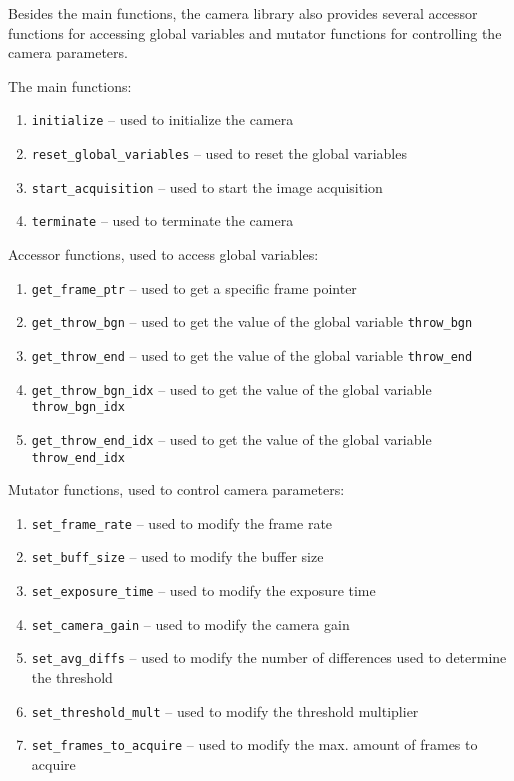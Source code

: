Besides the main functions, the camera library also provides several accessor functions for accessing global variables and mutator functions for controlling the camera parameters.

The main functions:

\begin{enumerate}
  \item \texttt{initialize} -- used to initialize the camera
  \item \texttt{reset\_global\_variables} -- used to reset the global variables
  \item \texttt{start\_acquisition} -- used to start the image acquisition
  \item \texttt{terminate} -- used to terminate the camera
\end{enumerate}

Accessor functions, used to access global variables:

\begin{enumerate}
  \item \texttt{get\_frame\_ptr} -- used to get a specific frame pointer
  \item \texttt{get\_throw\_bgn} -- used to get the value of the global variable \texttt{throw\_bgn}
  \item \texttt{get\_throw\_end} -- used to get the value of the global variable \texttt{throw\_end}
  \item \texttt{get\_throw\_bgn\_idx} -- used to get the value of the global variable \texttt{throw\_bgn\_idx}
  \item \texttt{get\_throw\_end\_idx} -- used to get the value of the global variable \texttt{throw\_end\_idx}
\end{enumerate}

Mutator functions, used to control camera parameters:

\begin{enumerate}
  \item \texttt{set\_frame\_rate} -- used to modify the frame rate
  \item \texttt{set\_buff\_size} -- used to modify the buffer size
  \item \texttt{set\_exposure\_time} -- used to modify the exposure time
  \item \texttt{set\_camera\_gain} -- used to modify the camera gain
  \item \texttt{set\_avg\_diffs} -- used to modify the number of differences used to determine the threshold
  \item \texttt{set\_threshold\_mult} -- used to modify the threshold multiplier
  \item \texttt{set\_frames\_to\_acquire} -- used to modify the max. amount of frames to acquire
\end{enumerate}

\clearpage
